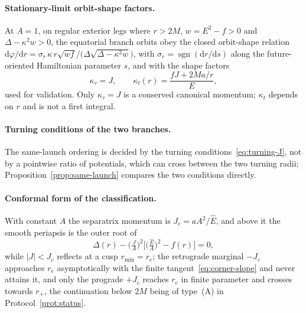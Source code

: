 \documentclass[12pt]{iopart}
\theoremstyle{plain}
\theoremstyle{definition}
\theoremstyle{remark}
\newcommand{\Ehat}{\hat E}
\newcommand{\rp}{r_{+}}
\newcommand{\re}{r_{e}}
\newcommand{\Jc}{J_{c}}
\newcommand{\dd}{\mathrm{d}}
\begin{document}
\paragraph{Stationary-limit orbit-shape factors.} At $A=1$, on regular exterior legs where
$r>2M$, $w=E^2-f>0$ and $\Delta-\kappa^2w>0$, the equatorial branch orbits obey the closed
orbit-shape relation
$\dd\varphi/\dd r=\sigma_r\,\kappa\,r\sqrt{wf}\big/\big(\Delta\sqrt{\Delta-\kappa^2w}\big)$,
with $\sigma_r=\operatorname{sgn}(\dd r/\dd s)$ along the future-oriented Hamiltonian
parameter $s$, and with the shape factors
\begin{equation}
    \kappa_\tau=J,\qquad
    \kappa_t(r)=\frac{fJ+2Ma/r}{E},
    \label{eq:kerr-conserved}
\end{equation}
used for validation. Only $\kappa_\tau=J$ is a conserved canonical momentum; $\kappa_t$
depends on $r$ and is not a first integral.

\paragraph{Turning conditions of the two branches.} The same-launch ordering is decided by the
turning conditions~\eqref{eq:turning-J}, not by a pointwise ratio of potentials, which can
cross between the two turning radii; Proposition~\ref{prop:same-launch} compares the two
conditions directly.

\paragraph{Conformal form of the classification.} With constant $A$ the separatrix momentum is
$\Jc=aA^2/\Ehat$, and above it the smooth periapsis is the outer root of
\begin{equation}
    \Delta(r)-\Big(\tfrac{J}{A}\Big)^2\Big[\big(\tfrac{\Ehat}{A}\big)^2-f(r)\Big]=0,
    \label{eq:periapsis-root}
\end{equation}
while $|J|<\Jc$ reflects at a cusp $r_{\min}=\re$; the retrograde marginal
$-\Jc$ approaches $\re$ asymptotically with the finite
tangent~\eqref{eq:corner-slope} and never attains it, and only the prograde
$+\Jc$ reaches $\re$ in finite parameter and crosses towards $\rp$, the
continuation below $2M$ being of type~(A) in Protocol~\ref{prot:status}.
\end{document}
